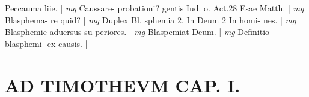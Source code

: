 \documentclass{article}
\begin{document}
\begin{pages}
\footnotesize Peccauma liie. 
\normalsize| 
\hspace{0.2cm}\textit{mg}
\footnotesize Caussare- probationi? gentis Iud. o. Act.28 Esae Matth. 
\normalsize| 
\hspace{0.2cm}\textit{mg}
\footnotesize Blasphema- re quid? 
\normalsize| 
\hspace{0.2cm}\textit{mg}
\footnotesize Duplex Bl. sphemia 2. In Deum 2 In homi- nes. 
\normalsize| 
\hspace{0.2cm}\textit{mg}
\footnotesize Blasphemie aduersus su periores. 
\normalsize| 
\hspace{0.2cm}\textit{mg}
\footnotesize Blaspemiat Deum. 
\normalsize| 
\hspace{0.2cm}\textit{mg}
\footnotesize Definitio blasphemi- ex causis. 
\normalsize| 
\section*{AD TIMOTHEVM CAP. I. }

\end{pages}
\end{document}
